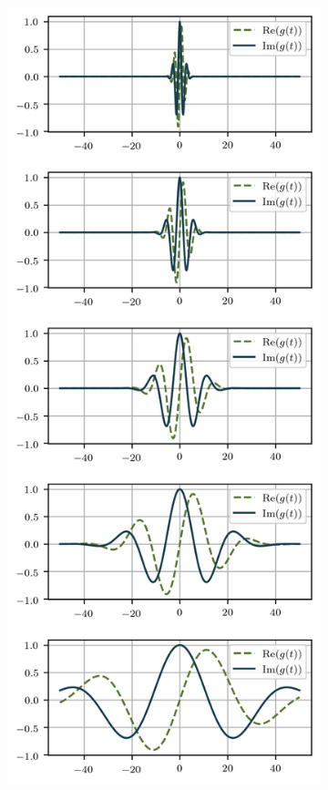 \documentclass[journal]{IEEEtran}
\begin{document}
\begin{figure}[!ht] 
	\centering
	\begin{subfigure}[b]{0.22\textwidth}
		\centering
		\includegraphics[width=\textwidth]{1D_space_GaborBank_m5_wo_env}

\end{subfigure}
\end{figure}
\end{document}
